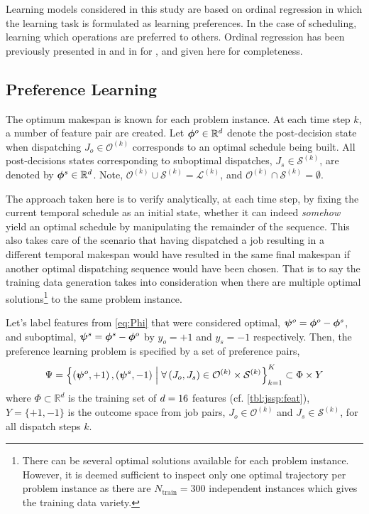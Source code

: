 \documentclass[smallextended]{svjour3}
\begin{document}
Learning models considered in this study are based on ordinal regression in 
which the learning task is formulated as learning preferences. In the case of 
scheduling, learning which operations are preferred to others. Ordinal 
regression has been previously presented in \cite{Ru06:PPSN} and in 
\cite{InRu11a} for \JSP, and given here for completeness. 

\subsection{Preference Learning}
The optimum makespan is known for each problem instance. At each time step $k$, 
a number of feature pair are created. 
Let $\bm{\phi}^{o}\in{\mathbb R}^d$ denote the post-decision state when dispatching 
$J_o\in\mathcal{O}^{(k)}$ corresponds to an optimal schedule being built. 
All post-decisions states corresponding to suboptimal dispatches, 
$J_s\in\mathcal{S}^{(k)}$, are denoted by $\bm{\phi}^{s}\in{\mathbb R}^d$.
Note, \mbox{$\mathcal{O}^{(k)}\cup\mathcal{S}^{(k)}=\mathcal{L}^{(k)}$}, and 
\mbox{$\mathcal{O}^{(k)}\cap\mathcal{S}^{(k)}=\emptyset$}.

The approach taken here is to verify analytically, at each time step, by fixing 
the current temporal schedule as an initial state, whether it can indeed 
\emph{somehow} yield an optimal schedule by manipulating the remainder of the 
sequence. This also takes care of the scenario that having dispatched a job 
resulting in a different temporal makespan would have resulted in the same 
final makespan if another optimal dispatching sequence would have been chosen. 
That is to say the training data generation takes into consideration when there 
are multiple optimal solutions\footnote{
  There can be several optimal solutions available for each problem instance. 
  However, it is deemed sufficient to inspect only one optimal trajectory per 
  problem instance as there are $N_{\text{train}}=300$ independent instances 
  which gives the training data variety.} 
to the same problem instance. 

Let's label features from \cref{eq:Phi} that were considered optimal, 
\mbox{$\bm \psi^{o}=\bm{\phi}^{o}-\bm{\phi}^{s}$}, and suboptimal, 
\mbox{$\bm \psi^{s}=\bm{\phi}^{s}-\bm{\phi}^{o}$} by $y_o=+1$ and $y_s=-1$ respectively.  
Then, the preference learning problem is specified by a set of preference pairs,
\begin{equation}
\Psi = 
\left\{\left(\bm \psi^o,+1\right),\left(\bm \psi^s,-1\right)
\;\middle|\;\forall \left(J_o,J_s\right) \in \mathcal{O}^{(k)} \times 
\mathcal{S}^{(k)}\right\}_{k=1}^{K} \subset \Phi\times Y \label{eq:prefset}
\end{equation}
where $\Phi\subset \mathbb{R}^d$ is the training set of $d=16$ 
features (cf. \cref{tbl:jssp:feat}), $Y=\{+1,-1\}$ is the outcome space from 
job pairs, $J_o\in\mathcal{O}^{(k)}$ and $J_s\in\mathcal{S}^{(k)}$, for all 
dispatch steps $k$.
\end{document}
